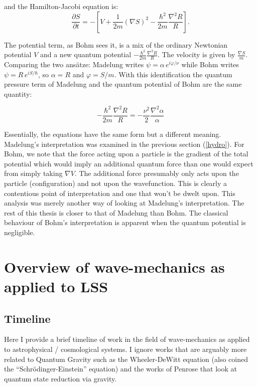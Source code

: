 \noindent and the Hamilton-Jacobi equation is: 
\begin{equation}
\frac{\partial S}{\partial t} = -\left[ V + \frac{1}{2m}(\nabla S)^2 -\frac{\hbar ^2}{2m} \frac{\nabla ^2R}{R} \right]. 
\end{equation}

\noindent The potential term, as Bohm sees it, is a mix of the ordinary Newtonian potential $V$ and a new quantum potential $-\frac{\hbar ^2}{2m} \frac{\nabla ^2 R}{R}$. The velocity is given by $\frac{\nabla S}{m}$. Comparing the two ans\"atze: Madelung writes $\psi = \alpha\, e^{i\varphi/\nu}$ while Bohm writes $\psi = R\, e^{iS/\hbar}$, so $\alpha = R$ and $\varphi = S/m$. With this identification the quantum pressure term of Madelung and the quantum potential of Bohm are the same quantity:

\begin{equation}
-\frac{\hbar ^2}{2m} \frac{\nabla ^2R}{R} = -\frac{\nu^2}{2}\frac{\nabla ^2\alpha}{\alpha} 
\end{equation}

\noindent Essentially, the equations have the same form but a different meaning. Madelung's interpretation was examined in the previous section (\ref{hydro}). For Bohm, we note that the force acting upon a particle is the gradient of the total potential which would imply an additional quantum force than one would expect from simply taking $\nabla V$. The additional force presumably only acts upon the particle (configuration) and not upon the wavefunction. This is clearly a contentious point of interpretation and one that won't be dwelt upon. This analysis was merely another way of looking at Madelung's interpretation. The rest of this thesis is closer to that of Madelung than Bohm. The classical behaviour of Bohm's interpretation is apparent when the quantum potential is negligible.



\section{Overview of wave-mechanics as applied to LSS}

\subsection{Timeline}
Here I provide a brief timeline of work in the field of wave-mechanics as applied to astrophysical / cosmological systems. I ignore works that are arguably more related to Quantum Gravity such as the Wheeler-DeWitt equation (also coined the ``Schr\"odinger-Einstein'' equation) and the works of Penrose that look at quantum state reduction via gravity.

